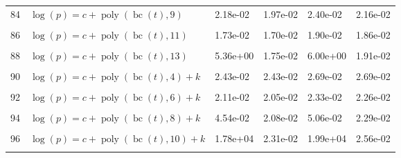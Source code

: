 \documentclass[12pt,a4paper]{article}
\DeclareMathOperator{\bc}{bc}
\DeclareMathOperator{\poly}{poly}
\begin{document}
\begin{longtable}[t]{ll>{\raggedleft\arraybackslash}p{2cm}>{\raggedleft\arraybackslash}p{2cm}>{\raggedleft\arraybackslash}p{2cm}>{\raggedleft\arraybackslash}p{2cm}}
84 & $\log(p) = c + \poly\left( \bc(t), 9 \right)$ & 2.18e-02 & 1.97e-02 & 2.40e-02 & 2.16e-02\\
\cellcolor{gray!6}{85} & \cellcolor{gray!6}{$\log(p) = c + \poly\left( \bc(t), 10 \right)$} & \cellcolor{gray!6}{1.77e+04} & \cellcolor{gray!6}{2.00e-02} & \cellcolor{gray!6}{1.98e+04} & \cellcolor{gray!6}{2.20e-02}\\
86 & $\log(p) = c + \poly\left( \bc(t), 11 \right)$ & 1.73e-02 & 1.70e-02 & 1.90e-02 & 1.86e-02\\
\cellcolor{gray!6}{87} & \cellcolor{gray!6}{$\log(p) = c + \poly\left( \bc(t), 12 \right)$} & \cellcolor{gray!6}{1.66e-02} & \cellcolor{gray!6}{1.66e-02} & \cellcolor{gray!6}{1.81e-02} & \cellcolor{gray!6}{1.81e-02}\\
88 & $\log(p) = c + \poly\left( \bc(t), 13 \right)$ & 5.36e+00 & 1.75e-02 & 6.00e+00 & 1.91e-02\\
\cellcolor{gray!6}{89} & \cellcolor{gray!6}{$\log(p) = c + \poly\left( \bc(t), 3 \right) + k$} & \cellcolor{gray!6}{3.04e-02} & \cellcolor{gray!6}{2.30e-02} & \cellcolor{gray!6}{3.38e-02} & \cellcolor{gray!6}{2.54e-02}\\
90 & $\log(p) = c + \poly\left( \bc(t), 4 \right) + k$ & 2.43e-02 & 2.43e-02 & 2.69e-02 & 2.69e-02\\
\cellcolor{gray!6}{91} & \cellcolor{gray!6}{$\log(p) = c + \poly\left( \bc(t), 5 \right) + k$} & \cellcolor{gray!6}{2.15e-02} & \cellcolor{gray!6}{2.06e-02} & \cellcolor{gray!6}{2.38e-02} & \cellcolor{gray!6}{2.27e-02}\\
92 & $\log(p) = c + \poly\left( \bc(t), 6 \right) + k$ & 2.11e-02 & 2.05e-02 & 2.33e-02 & 2.26e-02\\
\cellcolor{gray!6}{93} & \cellcolor{gray!6}{$\log(p) = c + \poly\left( \bc(t), 7 \right) + k$} & \cellcolor{gray!6}{2.06e-02} & \cellcolor{gray!6}{2.05e-02} & \cellcolor{gray!6}{2.28e-02} & \cellcolor{gray!6}{2.26e-02}\\
94 & $\log(p) = c + \poly\left( \bc(t), 8 \right) + k$ & 4.54e-02 & 2.08e-02 & 5.06e-02 & 2.29e-02\\
\cellcolor{gray!6}{95} & \cellcolor{gray!6}{$\log(p) = c + \poly\left( \bc(t), 9 \right) + k$} & \cellcolor{gray!6}{2.48e-02} & \cellcolor{gray!6}{2.29e-02} & \cellcolor{gray!6}{2.74e-02} & \cellcolor{gray!6}{2.53e-02}\\
96 & $\log(p) = c + \poly\left( \bc(t), 10 \right) + k$ & 1.78e+04 & 2.31e-02 & 1.99e+04 & 2.56e-02\\
\cellcolor{gray!6}{97} & \cellcolor{gray!6}{$\log(p) = c + \poly\left( \bc(t), 11 \right) + k$} & \cellcolor{gray!6}{2.09e-02} & \cellcolor{gray!6}{2.06e-02} & \cellcolor{gray!6}{2.31e-02} & \cellcolor{gray!6}{2.28e-02}\\

\end{longtable}
\end{document}
